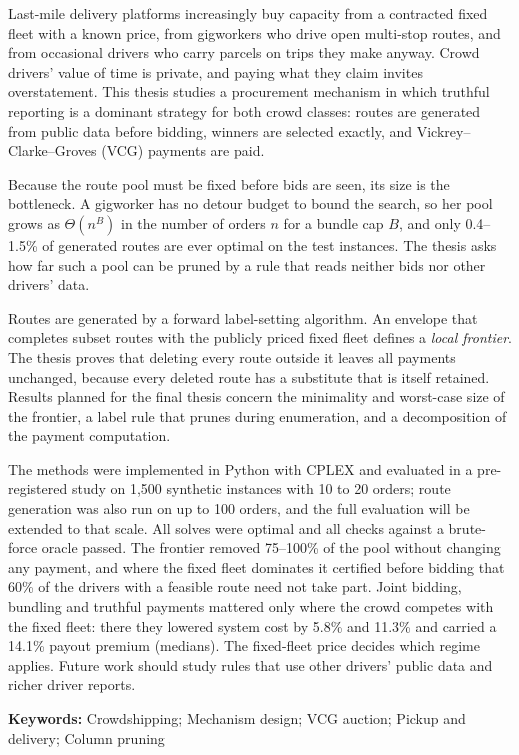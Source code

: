 
Last-mile delivery platforms increasingly buy capacity from a contracted
fixed fleet with a known price, from gigworkers who drive open multi-stop
routes, and from occasional drivers who carry parcels on trips they make
anyway. Crowd drivers' value of time is private, and paying what they claim
invites overstatement. This thesis studies a procurement mechanism in which
truthful reporting is a dominant strategy for both crowd classes: routes are
generated from public data before bidding, winners are selected exactly, and
Vickrey--Clarke--Groves (VCG) payments are paid.

Because the route pool must be fixed before bids are seen, its size is the
bottleneck. A gigworker has no detour budget to bound the search, so her
pool grows as $\Theta(n^B)$ in the number of orders $n$ for a bundle cap $B$,
and only 0.4--1.5\% of generated routes are ever optimal on the test
instances. The thesis asks how far such a pool can be pruned by a rule that
reads neither bids nor other drivers' data.

Routes are generated by a forward label-setting algorithm. An envelope that
completes subset routes with the publicly priced fixed fleet defines a
\emph{local frontier}. The thesis proves that deleting every route outside
it leaves all payments unchanged, because every deleted route has a
substitute that is itself retained. Results planned for the final thesis
concern the minimality and worst-case size of the frontier, a label rule
that prunes during enumeration, and a decomposition of the payment
computation.

The methods were implemented in Python with CPLEX and evaluated in a
pre-registered study on 1,500 synthetic instances with 10 to 20 orders;
route generation was also run on up to 100 orders, and the full evaluation
will be extended to that scale. All solves were optimal and all checks against a brute-force oracle passed. The
frontier removed 75--100\% of the pool without changing any payment, and
where the fixed fleet dominates it certified before bidding that 60\% of the
drivers with a feasible route need not take part. Joint bidding, bundling
and truthful payments mattered only where the crowd competes with the fixed
fleet: there they lowered system cost by 5.8\% and 11.3\% and carried a
14.1\% payout premium (medians). The fixed-fleet price decides which regime
applies. Future work should study rules that use other drivers' public data
and richer driver reports.

\medskip
\noindent\textbf{Keywords:} Crowdshipping; Mechanism design; VCG auction;
Pickup and delivery; Column pruning
